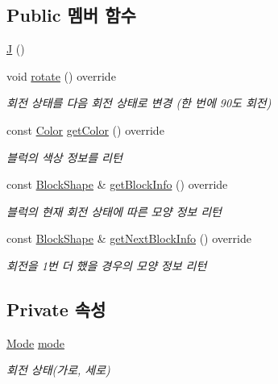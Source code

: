\subsection*{Public 멤버 함수}
\begin{DoxyCompactItemize}
\item 
\mbox{\hyperlink{class_j_ae3dc8b3467ed8bfd545c3b72bc9c3e70}{J}} ()
\item 
void \mbox{\hyperlink{class_j_a79f9fdd2b9542a95d3d2f82381b1cb62}{rotate}} () override
\begin{DoxyCompactList}\small\item\em 회전 상태를 다음 회전 상태로 변경 (한 번에 90도 회전) \end{DoxyCompactList}\item 
const \mbox{\hyperlink{class_block_ad054b4ac51df79aa910040b2a2fdf7b5}{Color}} \mbox{\hyperlink{class_j_a9055b5b54907c2fe1b9973cd74fc9c3e}{get\+Color}} () override
\begin{DoxyCompactList}\small\item\em 블럭의 색상 정보를 리턴 \end{DoxyCompactList}\item 
const \mbox{\hyperlink{class_block_aca5d951639f113e2ebd7856209d6b9ab}{Block\+Shape}} \& \mbox{\hyperlink{class_j_a2ef290578088ff6206767f6624748284}{get\+Block\+Info}} () override
\begin{DoxyCompactList}\small\item\em 블럭의 현재 회전 상태에 따른 모양 정보 리턴 \end{DoxyCompactList}\item 
const \mbox{\hyperlink{class_block_aca5d951639f113e2ebd7856209d6b9ab}{Block\+Shape}} \& \mbox{\hyperlink{class_j_aeeaf9ab45ccf61d0e7435e3d1bf04300}{get\+Next\+Block\+Info}} () override
\begin{DoxyCompactList}\small\item\em 회전을 1번 더 했을 경우의 모양 정보 리턴 \end{DoxyCompactList}\end{DoxyCompactItemize}
\subsection*{Private 속성}
\begin{DoxyCompactItemize}
\item 
\mbox{\hyperlink{class_block_a33a96023993478ad4b52426188454765}{Mode}} \mbox{\hyperlink{class_j_a84f29c2144ce2c8ca0d369060589f0f4}{mode}}
\begin{DoxyCompactList}\small\item\em 회전 상태(가로, 세로) \end{DoxyCompactList}\end{DoxyCompactItemize}
